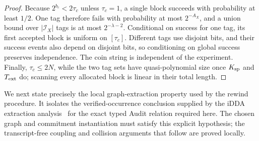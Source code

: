 \documentclass[11pt]{article}
\begin{document}
\begin{proof}
Because $2^{b_c}<2\tau_c$ unless $\tau_c=1$, a single block succeeds with
probability at least $1/2$.  One tag therefore fails with probability at most
$2^{-A_X}$, and a union bound over $|\mathcal I_X|$ tags is at most
$2^{-\lambda-2}$.  Conditional on success for one tag, its first accepted
block is uniform on $[\tau_c]$.  Different tags use disjoint bits, and their
success events also depend on disjoint bits, so conditioning on global success
preserves independence.  The coin string is independent of the experiment.
Finally, $\tau_c\le2N$, while the two tag sets have quasi-polynomial size once
$K_{\rm sp}$ and $T_{\rm ext}$ do; scanning every allocated block is linear in
their total length.
\end{proof}

We next state precisely the local graph-extraction property used by the rewind
procedure.  It isolates the verified-occurrence conclusion supplied by the
iDDA extraction analysis~\cite{ShiSilverMu2026} for the exact typed Audit
relation required here.  The chosen graph and commitment instantiation must
satisfy this explicit hypothesis; the transcript-free coupling and collision
arguments that follow are proved locally.
\end{document}
